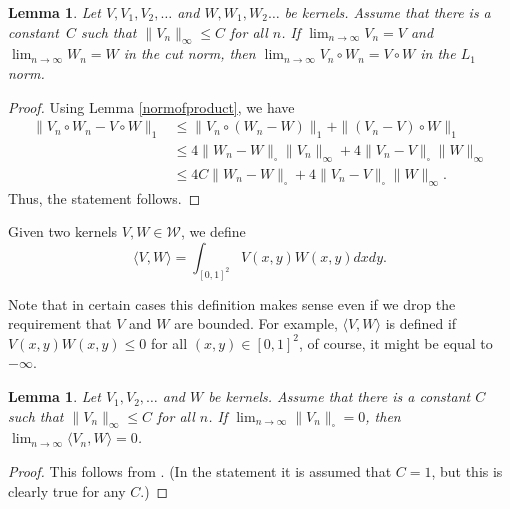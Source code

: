 \documentclass[11pt,a4paper]{article}
\theoremstyle{plain}
\newtheorem{lemma}[theorem]{Lemma}
\theoremstyle{definition}
\begin{document}
\begin{lemma}\label{limitofproduct}
Let $V,V_1,V_2,\dots$ and $W,W_1,W_2\dots$ be kernels. Assume that there is a constant~$C$ such that  $\|V_n\|_\infty\le C$ for all $n$. If $\lim_{n\to\infty} V_n=V$ and $\lim_{n\to\infty} W_n=W$ in the cut norm, then $\lim_{n\to\infty} V_n\circ W_n=V\circ W$ in the $L_1$ norm.  
\end{lemma}
\begin{proof}
Using Lemma \ref{normofproduct}, we have
\begin{align*}\|V_n\circ W_n-V\circ W\|_1&\le \|V_n\circ(W_n-W)\|_1+\|(V_n-V)\circ W\|_1
\\&\le 4\|W_n-W\|_\square \|V_n\|_\infty+4\|V_n-V\|_\square \|W\|_\infty\\&\le 4C\|W_n-W\|_\square +4\|V_n-V\|_\square \|W\|_\infty.
\end{align*}
Thus, the statement follows.
\end{proof}

Given two kernels $V,W\in\mathcal{W}$, we define
\[\langle V,W\rangle=\int_{[0,1]^2} V(x,y)W(x,y) dxdy.\]

Note that in certain cases this definition makes sense even if we drop the requirement that $V$ and $W$ are bounded. For example, $\langle V,W\rangle$ is defined if $V(x,y)W(x,y)\le 0$ for all $(x,y)\in [0,1]^2$, of course, it might be equal to $-\infty$.

\begin{lemma}\label{lemmaangle0}
    Let $V_1,V_2,\dots$ and $W$ be kernels. Assume that there is a constant $C$ such that   $\|V_n\|_\infty\le C$ for all $n$. If $\lim_{n\to\infty} \|V_n\|_\square=0$, then $\lim_{n\to\infty} \langle V_n,W\rangle =0$.
\end{lemma}
\begin{proof}
This follows from \cite[Lemma 8.22]{lovasz2012large}. (In the statement \cite[Lemma 8.22]{lovasz2012large} it is assumed that $C=1$, but this is clearly true for any $C$.)
\end{proof}
\end{document}
